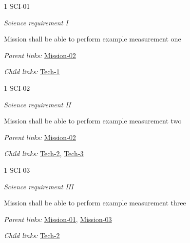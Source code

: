 \begin{frame}{1 SCI-01}
\protect\hypertarget{SCI-01}{}

\emph{Science requirement I}

Mission shall be able to perform example measurement one

\emph{Parent links:} \href{L1.html\#Mission-02}{Mission-02}

\emph{Child links:} \href{L3.html\#Tech-1}{Tech-1}

\end{frame}

\begin{frame}{1 SCI-02}
\protect\hypertarget{SCI-02}{}

\emph{Science requirement II}

Mission shall be able to perform example measurement two

\emph{Parent links:} \href{L1.html\#Mission-02}{Mission-02}

\emph{Child links:} \href{L3.html\#Tech-2}{Tech-2},
\href{L3.html\#Tech-3}{Tech-3}

\end{frame}

\begin{frame}{1 SCI-03}
\protect\hypertarget{SCI-03}{}

\emph{Science requirement III}

Mission shall be able to perform example measurement three

\emph{Parent links:} \href{L1.html\#Mission-01}{Mission-01},
\href{L1.html\#Mission-03}{Mission-03}

\emph{Child links:} \href{L3.html\#Tech-2}{Tech-2}

\end{frame}
